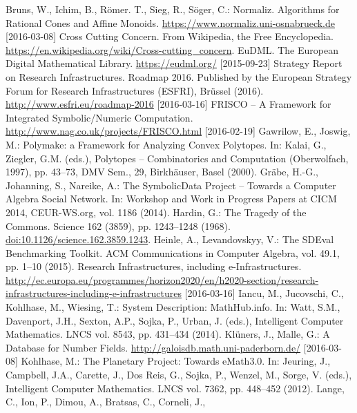 \documentclass{llncs}
\newcommand{\SD}{{\sc Symbo\-lic\-Data}}
\begin{document}
\raggedright
\begin{thebibliography}{xxx}
 Bruns, W., Ichim, B., R\"omer. T., Sieg, R., S\"oger, C.:
  Normaliz. Algorithms for Rational Cones and Affine Monoids.
  \url{https://www.normaliz.uni-osnabrueck.de} [2016-03-08]
 Cross Cutting Concern. From Wikipedia, the Free Encyclopedia.
  \url{https://en.wikipedia.org/wiki/Cross-cutting_concern}.
 EuDML. The European Digital Mathematical Library.
  \url{https://eudml.org/} [2015-09-23]
 Strategy Report on Research Infrastructures.  Roadmap 2016.
  Published by the European Strategy Forum for Research Infrastructures
  (ESFRI), Brüssel (2016).  \url{http://www.esfri.eu/roadmap-2016} [2016-03-16]
 FRISCO -- A Framework for Integrated Symbolic/Numeric
  Computation. \url{http://www.nag.co.uk/projects/FRISCO.html} [2016-02-19]
 Gawrilow, E., Joswig, M.: Polymake: a Framework for
  Analyzing Convex Polytopes. In: Kalai, G., Ziegler, G.M. (eds.), Polytopes --
  Combinatorics and Computation (Oberwolfach, 1997), pp. 43--73, DMV Sem., 29,
  Birkh\"auser, Basel (2000). 
 Gr\"abe, H.-G., Johanning, S., Nareike, A.: The {\SD} Project
  -- Towards a Computer Algebra Social Network. In: Workshop and Work in
  Progress Papers at CICM 2014, CEUR-WS.org, vol. 1186 (2014).
 Hardin, G.: The Tragedy of the Commons. Science 162 (3859),
  pp. 1243--1248 (1968). \url{doi:10.1126/science.162.3859.1243}. 
 Heinle, A., Levandovskyy, V.: The SDEval Benchmarking
  Toolkit. ACM Communications in Computer Algebra, vol. 49.1, pp. 1--10 (2015).
 Research Infrastructures, including e-Infrastructures.
  \url{http://ec.europa.eu/programmes/horizon2020/en/h2020-section/research-infrastructures-including-e-infrastructures} [2016-03-16]
 Iancu, M., Jucovschi, C., Kohlhase, M., Wiesing, T.: System
  Description: MathHub.info. In: Watt, S.M., Davenport, J.H., Sexton, A.P.,
  Sojka, P., Urban, J. (eds.), Intelligent Computer Mathematics. LNCS vol.
  8543, pp. 431--434 (2014).
 Kl\"uners, J., Malle, G.: A Database for Number Fields.
  \url{http://galoisdb.math.uni-paderborn.de/} [2016-03-08]
 Kohlhase, M.: The Planetary Project: Towards eMath3.0. In:
  Jeuring, J., Campbell, J.A., Carette, J., Dos Reis, G., Sojka, P., Wenzel,
  M., Sorge, V. (eds.), Intelligent Computer Mathematics.  LNCS vol. 7362,
  pp. 448--452 (2012).
 Lange, C., Ion, P., Dimou, A., Bratsas, C., Corneli, J.,

\end{thebibliography}
\end{document}
